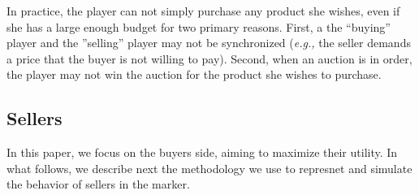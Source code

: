In practice, the player can not simply purchase any product she wishes, even if she has a large enough budget for two primary reasons. First, a the ``buying'' player and the ''selling'' player may not be synchronized (\emph{e.g.,} the seller demands a price that the buyer is not willing to pay). Second, when an auction is in order, the player may not win the auction for the product she wishes to purchase. 

\subsection{Sellers}

In this paper, we focus on the buyers side, aiming to maximize their utility. In what follows, we describe next the methodology we use to represnet and simulate the behavior of sellers in the marker.
